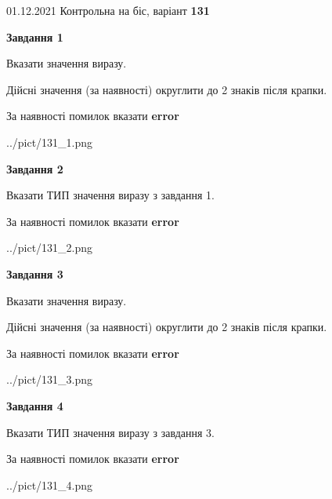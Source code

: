 \documentclass[11pt, ukrainian]{article}
\begin{document}
{01.12.2021 Контрольна на біс, варіант  \No \textbf { 131 }\par}
{
\begin {large}
{\begin {center}\textbf{Завдання 1}\end {center}}\par
Вказати значення виразу. \par
Дійсні значення (за наявності) округлити до 2 знаків після крапки. \par
За наявності помилок вказати \textbf{error}

\begin{center}
	{../pict/131_1.png}
\end{center}
\newpage

{\begin {center}\textbf{Завдання 2}\end {center}}\par
Вказати ТИП значення виразу з завдання 1. \par
За наявності помилок вказати \textbf{error}

\begin{center}
	{../pict/131_2.png}
\end{center}
\newpage

{\begin {center}\textbf{Завдання 3}\end {center}}\par
Вказати значення виразу. \par
Дійсні значення (за наявності) округлити до 2 знаків після крапки. \par
За наявності помилок вказати \textbf{error}

\begin{center}
	{../pict/131_3.png}
\end{center}
\newpage

{\begin {center}\textbf{Завдання 4}\end {center}}\par
Вказати ТИП значення виразу з завдання 3. \par
За наявності помилок вказати \textbf{error}

\begin{center}
	{../pict/131_4.png}
\end{center}
\newpage


\end{large}}
\end{document}
